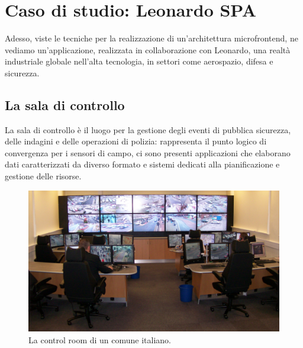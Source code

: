 \chapter{Caso di studio: Leonardo SPA}\label{ch:leonardo}
Adesso, viste le tecniche per la realizzazione di un'architettura microfrontend, ne vediamo
un'applicazione, realizzata in collaborazione con Leonardo, una realtà industriale globale 
nell'alta tecnologia, in settori come aerospazio, difesa e sicurezza.
\section{La sala di controllo}

La sala di controllo è il luogo per la gestione degli eventi di pubblica sicurezza, delle indagini e
delle operazioni di polizia: rappresenta il punto logico di convergenza per i sensori di campo,
ci sono presenti applicazioni che elaborano dati caratterizzati da diverso formato 
e sistemi dedicati alla pianificazione e gestione delle risorse.
\begin{figure}[H]
  \centering
  \includegraphics[width=140mm]{img/control-room.jpeg}
  \caption{La control room di un comune italiano.}
\end{figure}
 
